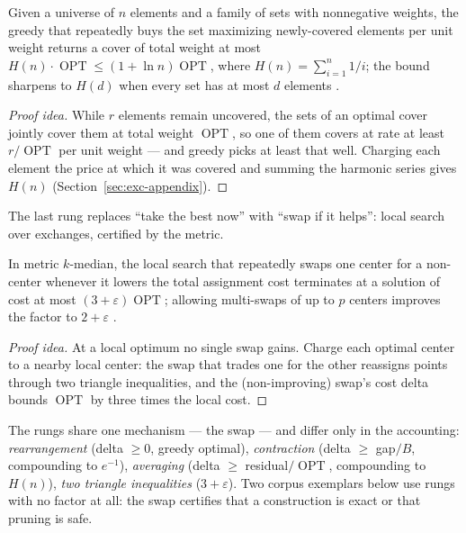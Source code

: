 \begin{theorem}\label{thm:exc-cover}
Given a universe of $n$ elements and a family of sets with nonnegative weights, the
greedy that repeatedly buys the set maximizing newly-covered elements per unit weight
returns a cover of total weight at most $H(n)\cdot\operatorname{OPT} \le
(1+\ln n)\operatorname{OPT}$, where $H(n)=\sum_{i=1}^{n}1/i$; the bound sharpens to
$H(d)$ when every set has at most $d$ elements \citep{exchange-greedy-bg3}. \eop
\end{theorem}

\begin{proof}[Proof idea]
While $r$ elements remain uncovered, the sets of an optimal cover jointly cover them
at total weight $\operatorname{OPT}$, so one of them covers at rate at least
$r/\operatorname{OPT}$ per unit weight --- and greedy picks at least that well.
Charging each element the price at which it was covered and summing the harmonic
series gives $H(n)$ (Section~\ref{sec:exc-appendix}).
\end{proof}

The last rung replaces ``take the best now'' with ``swap if it helps'': local search
over exchanges, certified by the metric.

\begin{theorem}\label{thm:exc-kmedian}
In metric $k$-median, the local search that repeatedly swaps one center for a
non-center whenever it lowers the total assignment cost terminates at a solution of
cost at most $(3+\varepsilon)\operatorname{OPT}$; allowing multi-swaps of up to $p$
centers improves the factor to $2+\varepsilon$ \citep{exchange-greedy-bg4}. \eop
\end{theorem}

\begin{proof}[Proof idea]
At a local optimum no single swap gains. Charge each optimal center to a nearby local
center: the swap that trades one for the other reassigns points through two triangle
inequalities, and the (non-improving) swap's cost delta bounds
$\operatorname{OPT}$ by three times the local cost.
\end{proof}

The rungs share one mechanism --- the swap --- and differ only in the accounting:
\emph{rearrangement} (delta $\ge 0$, greedy optimal), \emph{contraction} (delta $\ge$
gap$/B$, compounding to $e^{-1}$), \emph{averaging} (delta $\ge$
residual$/\operatorname{OPT}$, compounding to $H(n)$), \emph{two triangle
inequalities} ($3+\varepsilon$). Two corpus exemplars below use rungs with no factor
at all: the swap certifies that a construction is exact or that pruning is safe.

